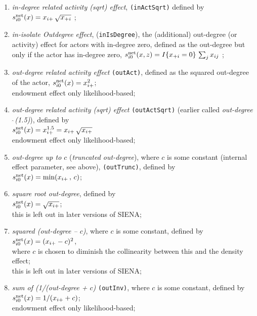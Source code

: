 \documentclass[a4paper,fleqn,11pt]{article}
\newcommand{\+}{\, + \,}
\newcommand{\vit}{\theenumi}
\newcommand{\si}{{\sf SIENA}}
\begin{document}
\begin{enumerate}
 \item {\em in-degree related activity (sqrt) effect}, \texttt{(inActSqrt)}
 defined by  \\
 $s^{\rm net}_{i\vit}(x) = x_{i+}\,\sqrt{x_{+i}}$ ;

\item \emph{in-isolate Outdegree effect}, (\texttt{inIsDegree}), the
      (additional) out-degree (or activity)
      effect for actors with in-degree zero, defined as the out-degree
      but only if the actor has in-degree zero,
 $s^{\rm net}_{i\vit}(x, z) =   I\{x_{+i} = 0 \}\, \sum_j x_{ij}   $ ;\\

 \item {\em out-degree related activity effect} \texttt{(outAct)},
 	 defined as the squared out-degree of the actor,
 $s^{\rm net}_{i\vit}(x) = x^2_{i+}$;\\
 endowment effect only likelihood-based;

 \item {\em out-degree related activity (sqrt) effect}  \texttt{(outActSqrt)}
 (earlier called {\em out-degree$\,\hat{\ }$(1.5)}), defined by  \\
 $s^{\rm net}_{i\vit}(x) = x^{1.5}_{i+} = x_{i+}\,\sqrt{x_{i+}}$ \\
 endowment effect only likelihood-based;

 \item {\em out-degree up to $c$} (\emph{truncated out-degree}),
 where $c$ is some constant
 (internal effect parameter, see above),  \texttt{(outTrunc)},
 defined by  \\
 $s^{\rm net}_{i\vit}(x) = \text{min}(x_{i+}\,,\, c)$;

 \item {\em square root out-degree}, defined by  \\
 $s^{\rm net}_{i\vit}(x) = \sqrt{x_{i+}}$;\\
 this is left out in later versions of \si;

 \item {\em squared (out-degree -- $c$)}, where $c$ is some constant,
 defined by  \\
 $s^{\rm net}_{i\vit}(x) = (x_{i+} - c)^2$,\\
 where $c$ is chosen to diminish the collinearity between this
 and the density effect;\\
 this is left out in later versions of \si;

 \item {\em sum of (1/(out-degree + $c$)} \texttt{(outInv)},
 where $c$ is some constant,  defined by  \\
 $s^{\rm net}_{i\vit}(x) = 1/(x_{i+} + c)$;\\
 endowment effect only likelihood-based;


\end{enumerate}
\end{document}
